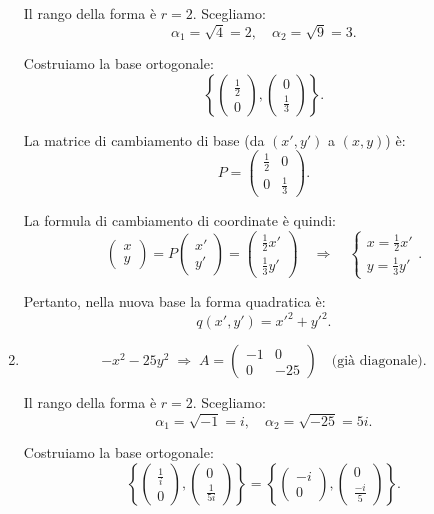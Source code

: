 \documentclass{article}
\theoremstyle{plain}
\theoremstyle{definition}
\theoremstyle{remark}
\begin{document}
\begin{enumerate}
Il rango della forma è \(r = 2\). Scegliamo:
\[
\alpha_1 = \sqrt{4} = 2, \quad \alpha_2 = \sqrt{9} = 3.
\]

Costruiamo la base ortogonale:
\[
\left\{
\begin{pmatrix}
\frac{1}{2} \\
0
\end{pmatrix},
\begin{pmatrix}
0 \\
\frac{1}{3}
\end{pmatrix}
\right\}.
\]

La matrice di cambiamento di base (da \((x', y')\) a \((x, y)\)) è:
\[
P = \begin{pmatrix}
\frac{1}{2} & 0 \\
0 & \frac{1}{3}
\end{pmatrix}.
\]

La formula di cambiamento di coordinate è quindi:
\[
\begin{pmatrix}
x \\
y
\end{pmatrix}
=
P \begin{pmatrix}
x' \\
y'
\end{pmatrix}
=
\begin{pmatrix}
\frac{1}{2}x' \\
\frac{1}{3}y'
\end{pmatrix}
\quad \Rightarrow \quad
\begin{cases}
x = \frac{1}{2}x' \\
y = \frac{1}{3}y'
\end{cases}.
\]

Pertanto, nella nuova base la forma quadratica è:
\[
q(x', y') = x'^2 + y'^2.
\]


    \item \[
-x^2 - 25y^2 \;\Rightarrow\;
A = \begin{pmatrix}
-1 & 0 \\
0 & -25
\end{pmatrix}
\quad \text{(già diagonale)}.
\]

Il rango della forma è \(r = 2\). Scegliamo:
\[
\alpha_1 = \sqrt{-1} = i, \quad \alpha_2 = \sqrt{-25} = 5i.
\]

Costruiamo la base ortogonale:
\[
\left\{
\begin{pmatrix}
\frac{1}{i} \\
0
\end{pmatrix},
\begin{pmatrix}
0 \\
\frac{1}{5i}
\end{pmatrix}
\right\}
=
\left\{
\begin{pmatrix}
-i \\
0
\end{pmatrix},
\begin{pmatrix}
0 \\
\frac{-i}{5}
\end{pmatrix}
\right\}.
\]


\end{enumerate}
\end{document}
